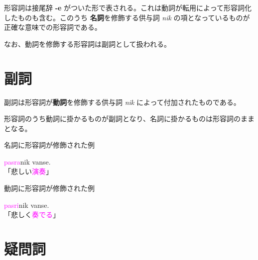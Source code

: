 形容詞は接尾辞 \textbf{-e} がついた形で表される。これは動詞が転用によって形容詞化したものも含む。このうち \textbf{名詞}を修飾する供与詞 \emph{nik} の項となっているものが正確な意味での形容詞である。

なお、動詞を修飾する形容詞は副詞として扱われる。

\section{副詞}

副詞は形容詞が\textbf{動詞}を修飾する供与詞 \emph{nik} によって付加されたものである。

形容詞のうち動詞に掛かるものが副詞となり、名詞に掛かるものは形容詞のままとなる。

\begin{itembox}[l]{名詞に形容詞が修飾された例}
    \begin{pindent}
        \noindent
        \textcolor{magenta}{pasra}nik vanse. \\
        「悲しい\textcolor{magenta}{演奏}」
    \end{pindent}
\end{itembox}

\begin{itembox}[l]{動詞に形容詞が修飾された例}
    \begin{pindent}
        \noindent
        \textcolor{magenta}{pasri}nik vanse. \\
        「悲しく\textcolor{magenta}{奏でる}」
    \end{pindent}
\end{itembox}

\section{疑問詞}


